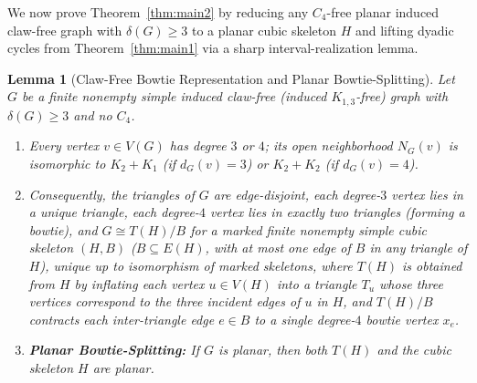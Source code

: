 \documentclass[11pt,reqno]{amsart}
\theoremstyle{plain}
\newtheorem{lemma}[theorem]{Lemma}
\theoremstyle{definition}
\theoremstyle{remark}
\DeclareRobustCommand{\_}{\ifmmode\text{\textunderscore}\else\textunderscore\allowbreak\fi}
\begin{document}
We now prove Theorem~\ref{thm:main2} by reducing any $C_4$-free planar induced claw-free graph with $\delta(G) \ge 3$ to a planar cubic skeleton $H$ and lifting dyadic cycles from Theorem~\ref{thm:main1} via a sharp interval-realization lemma.

\begin{lemma}[Claw-Free Bowtie Representation and Planar Bowtie-Splitting]\label{lem:clawfree-split}
Let $G$ be a finite nonempty simple induced claw-free (induced $K_{1,3}$-free) graph with $\delta(G) \ge 3$ and no $C_4$.
\begin{enumerate}[label=(\roman*),leftmargin=2.2em]
  \item Every vertex $v \in V(G)$ has degree $3$ or $4$; its open neighborhood $N_G(v)$ is isomorphic to $K_2 + K_1$ (if $d_G(v) = 3$) or $K_2 + K_2$ (if $d_G(v) = 4$).
  \item Consequently, the triangles of $G$ are edge-disjoint, each degree-$3$ vertex lies in a unique triangle, each degree-$4$ vertex lies in exactly two triangles (forming a \emph{bowtie}), and $G \cong T(H)/B$ for a marked finite nonempty simple cubic skeleton $(H, B)$ ($B \subseteq E(H)$, with at most one edge of $B$ in any triangle of $H$), unique up to isomorphism of marked skeletons, where $T(H)$ is obtained from $H$ by inflating each vertex $u \in V(H)$ into a triangle $T_u$ whose three vertices correspond to the three incident edges of $u$ in $H$, and $T(H)/B$ contracts each inter-triangle edge $e \in B$ to a single degree-$4$ bowtie vertex $x_e$.
  \item \textbf{Planar Bowtie-Splitting:} If $G$ is planar, then both $T(H)$ and the cubic skeleton $H$ are planar.
\end{enumerate}
\end{lemma}
\end{document}

